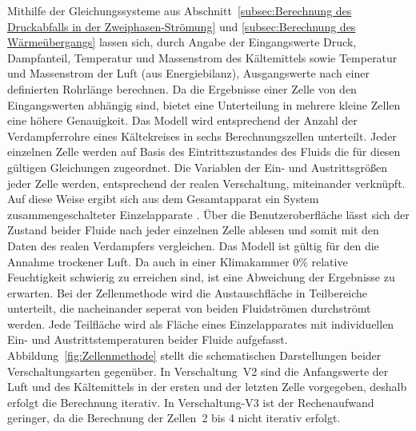 Mithilfe der Gleichungssysteme aus Abschnitt~\ref{subsec:Berechnung des Druckabfalls in der Zweiphasen-Strömung} und \ref{subsec:Berechnung des Wärmeübergangs} lassen sich, durch Angabe der Eingangswerte Druck, Dampfanteil, Temperatur und Massenstrom des Kältemittels sowie Temperatur und Massenstrom der Luft (aus Energiebilanz), Ausgangswerte nach einer definierten Rohrlänge berechnen. Da die Ergebnisse einer Zelle von den Eingangswerten abhängig sind, bietet eine Unterteilung in mehrere kleine Zellen eine höhere Genauigkeit. Das Modell wird entsprechend der Anzahl der Verdampferrohre eines Kältekreises in sechs Berechnungszellen unterteilt. Jeder einzelnen Zelle werden auf Basis des Eintrittszustandes des Fluids die für diesen gültigen Gleichungen zugeordnet. Die Variablen der Ein- und Austrittsgrößen jeder Zelle werden, entsprechend der realen Verschaltung, miteinander verknüpft. Auf diese Weise ergibt sich aus dem Gesamtapparat ein System zusammengeschalteter Einzelapparate \cite{LehrstuhlfurWarmeundStoffubertragung.b}.
Über die Benutzeroberfläche lässt sich der Zustand beider Fluide nach jeder einzelnen Zelle ablesen und somit mit den Daten des realen Verdampfers vergleichen.
Das Modell ist gültig für den die Annahme trockener Luft. Da auch in einer Klimakammer \unit{0}{\%} relative Feuchtigkeit schwierig zu erreichen sind, ist eine Abweichung der Ergebnisse zu erwarten. \newline
Bei der Zellenmethode wird die Austauschfläche in Teilbereiche unterteilt, die nacheinander seperat von beiden Fluidströmen durchströmt werden. Jede Teilfläche wird als Fläche eines Einzelapparates mit individuellen Ein- und Austrittstemperaturen beider Fluide aufgefasst. Abbildung~\ref{fig:Zellenmethode} stellt die schematischen Darstellungen beider Verschaltungsarten gegenüber. In Verschaltung~V2 sind die Anfangswerte der Luft und des Kältemittels in der ersten und der letzten Zelle vorgegeben, deshalb erfolgt die Berechnung iterativ. In Verschaltung-V3 ist der Rechenaufwand geringer, da die Berechnung der Zellen~2 bis 4 nicht iterativ erfolgt.

